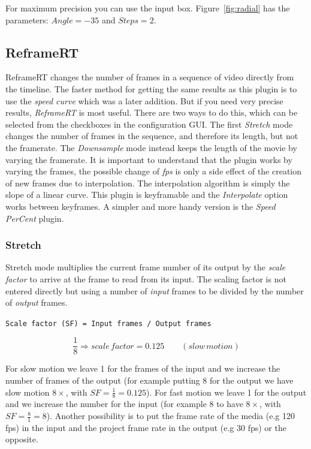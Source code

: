 For maximum precision you can use the input box.
Figure~\ref{fig:radial} has the parameters: $Angle=-35$ and $Steps=2$.


\subsection{ReframeRT}%
\label{sub:reframert}

ReframeRT changes the number of frames in a sequence of video
directly from the timeline. The faster method for getting the same
results as this plugin is to use the \textit{speed curve} which was
a later addition. But if you need very precise results,
\textit{ReframeRT} is most useful. There are two ways to do this,
which can be selected from the checkboxes in the configuration
GUI\@. The first \textit{Stretch} mode changes the number of frames in
the sequence, and therefore its length, but not the framerate. The
\textit{Downsample} mode instead keeps the length of the movie by
varying the framerate.  It is important to understand that the
plugin works by varying the frames, the possible change of
\textit{fps} is only a side effect of the creation of new frames due
to interpolation. The interpolation algorithm is simply the slope of a linear curve. This plugin is keyframable and the \textit{Interpolate} option works between keyframes. A simpler and more handy version is the \textit{Speed PerCent} plugin.

\subsubsection*{Stretch}%
\label{ssub:stretch}

Stretch mode multiplies the current frame number of its output by the \textit{scale factor} to arrive at the frame to read from its input. The scaling factor is not entered directly but using a number of \textit{input} frames to be divided by the number of \textit{output} frames.

\vspace{1ex} \texttt{Scale factor (SF) = Input frames / Output frames}

\[\frac{1}{8} \Rightarrow scale\, factor = 0.125 \qquad (slow\, motion)\]

For slow motion we leave 1 for the frames of the input and we increase the number of frames of the output (for example putting 8 for the output we have slow motion $8\times$, with $SF=\frac{1}{8}=0.125$). For fast motion we leave 1 for the output and we increase the number for the input (for example 8 to have $8\times$, with $SF=\frac{8}{1}=8$). Another possibility is to put the frame rate of the media (e.g 120 fps) in the input and the project frame rate in the output (e.g 30 fps) or the opposite.

